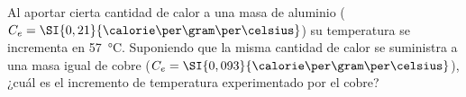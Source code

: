 Al aportar cierta cantidad de calor a una masa de aluminio ($C_e = \SI{0,21}{\calorie\per\gram\per\celsius}$) su temperatura se incrementa en \SI{57}{\celsius}. Suponiendo que la misma cantidad de calor se suministra a una masa igual de cobre ($C_e = \SI{0,093}{\calorie\per\gram\per\celsius}$), ¿cuál es el incremento de temperatura experimentado por el cobre?

